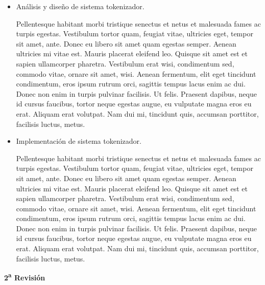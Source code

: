 \documentclass[10pt, letterpaper]{article}
\begin{document}
  \begin{itemize}

    \item Análisis y diseño de sistema tokenizador.

      Pellentesque habitant morbi tristique senectus et netus et malesuada fames
      ac turpis egestas. Vestibulum tortor quam, feugiat vitae, ultricies eget,
      tempor sit amet, ante. Donec eu libero sit amet quam egestas semper.
      Aenean ultricies mi vitae est. Mauris placerat eleifend leo. Quisque sit
      amet est et sapien ullamcorper pharetra. Vestibulum erat wisi, condimentum
      sed, commodo vitae, ornare sit amet, wisi. Aenean fermentum, elit eget
      tincidunt condimentum, eros ipsum rutrum orci, sagittis tempus lacus enim
      ac dui. Donec non enim in turpis pulvinar facilisis. Ut felis. Praesent
      dapibus, neque id cursus faucibus, tortor neque egestas augue, eu
      vulputate magna eros eu erat. Aliquam erat volutpat. Nam dui mi, tincidunt
      quis, accumsan porttitor, facilisis luctus, metus.

    \item Implementación de sistema tokenizador.

      Pellentesque habitant morbi tristique senectus et netus et malesuada fames
      ac turpis egestas. Vestibulum tortor quam, feugiat vitae, ultricies eget,
      tempor sit amet, ante. Donec eu libero sit amet quam egestas semper.
      Aenean ultricies mi vitae est. Mauris placerat eleifend leo. Quisque sit
      amet est et sapien ullamcorper pharetra. Vestibulum erat wisi, condimentum
      sed, commodo vitae, ornare sit amet, wisi. Aenean fermentum, elit eget
      tincidunt condimentum, eros ipsum rutrum orci, sagittis tempus lacus enim
      ac dui. Donec non enim in turpis pulvinar facilisis. Ut felis. Praesent
      dapibus, neque id cursus faucibus, tortor neque egestas augue, eu
      vulputate magna eros eu erat. Aliquam erat volutpat. Nam dui mi, tincidunt
      quis, accumsan porttitor, facilisis luctus, metus.

  \end{itemize}

  \noindent
  \textbf{2\textsuperscript{a} Revisión}
\end{document}
